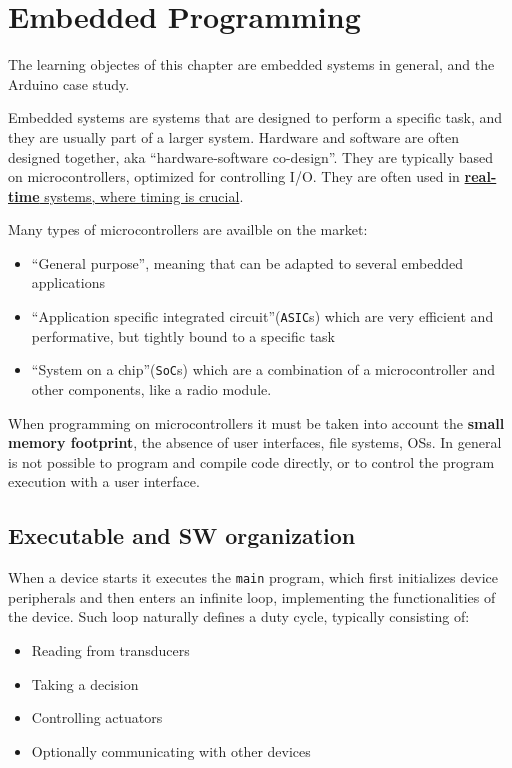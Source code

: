\chapter{Embedded Programming}
The learning objectes of this chapter are embedded systems in general, and the Arduino case study.

Embedded systems are systems that are designed to perform a specific task, and they are usually part of a larger system.
Hardware and software are often designed together, aka ``hardware-software co-design''.
They are typically based on microcontrollers, optimized for controlling I/O.
They are often used in \ul{\textbf{real-time} systems, where timing is crucial}.

Many types of microcontrollers are availble on the market:
\begin{itemize}
   \item ``General purpose'', meaning that can be adapted to several embedded applications
   \item ``Application specific integrated circuit''(\texttt{ASIC}s) which are very efficient and performative, but tightly bound to a specific task
   \item ``System on a chip''(\texttt{SoC}s) which are a combination of a microcontroller and other components, like a radio module. 
\end{itemize}

When programming on microcontrollers it must be taken into account the \textbf{small memory footprint}, the absence of user interfaces, file systems, OSs.
In general is not possible to program and compile code directly, or to control the program execution with a user interface.


\section{Executable and SW organization}
When a device starts it executes the \texttt{main} program, which first initializes device peripherals and then enters an infinite loop, implementing the functionalities of the device.
Such loop naturally defines a duty cycle, typically consisting of:
\begin{itemize}
   \item Reading from transducers
   \item Taking a decision
   \item Controlling actuators
   \item Optionally communicating with other devices
\end{itemize}

